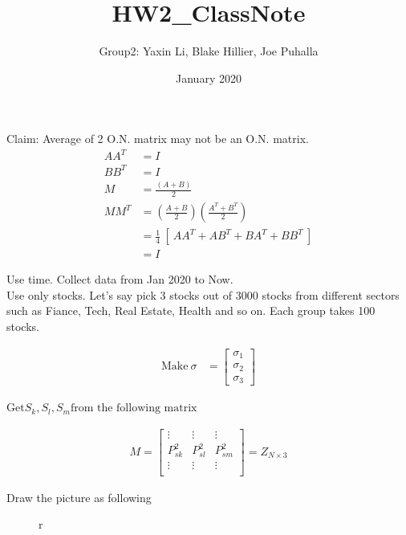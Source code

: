 \documentclass{article}
\title{HW2\_ClassNote}
\author{Group2: Yaxin Li, Blake Hillier, Joe Puhalla}
\date{January 2020}
\begin{document}
\maketitle

Claim: Average of 2 O.N. matrix may not be an O.N. matrix.
\begin{align*}
    AA^{T} &= I \\
    BB^{T} &= I \\
    M &= \frac{(A+B)}{2} \\
    MM^{T} &= (\frac{A+B}{2})(\frac{A^{T}+B^{T}}{2}) \\
        &= \frac{1}{4}\ [\ AA^{T}+AB^{T}+BA^{T}+BB^{T} \ ] \\
        &=I
\end{align*}

Use time. Collect data from Jan 2020 to Now.\\

Use only stocks. Let's say pick 3 stocks out of 3000 stocks from different sectors such as Fiance, Tech, Real Estate, Health and so on. Each group takes 100 stocks.

\begin{align*}
    \text{Make}\ \sigma &= \begin{bmatrix}
           \sigma_{1} \\
           \sigma_{2} \\
           \sigma_{3}
         \end{bmatrix}
\end{align*}

$\text{Get} S_{k}, S_{l}, S_{m} \text{from the following matrix}$

\begin{align*}
  M=
  \left[ {\begin{array}{ccccc}
   \vdots & \vdots & \vdots \\
   P_{sk}^2 & P_{sl}^2 & P_{sm}^2 \\
   \vdots & \vdots & \vdots \\
  \end{array} } \right] = Z_{N\times3}
\end{align*}

Draw the picture as following\\
\graphicspath{ {./images/} }

\begin{figure}{r}
\end{figure}
\end{document}
